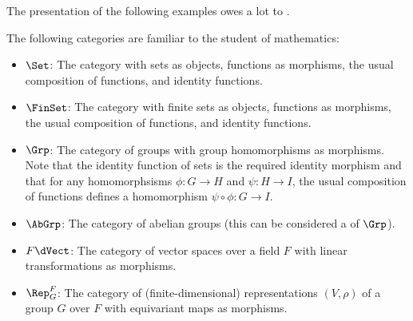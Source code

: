 \documentclass[a5paper]{article}
\begin{document}

The presentation of the following examples owes a lot to \cite{riehl}.

\begin{example}
	The following categories are familiar to the student of
  mathematics:
  \begin{itemize}
    \itemsep-0.2em
    \item $\Set$: The category with sets as objects, functions as morphisms,
      the usual composition of functions, and identity functions.
    \item $\FinSet$: The category with finite sets as objects, functions as
      morphisms, the usual composition of functions, and identity functions.
    \item $\Grp$: The category of groups with group homomorphisms
      as morphisms. Note that the identity function of sets is the required
      identity morphism and that for any homomorphsisms $ϕ:G\to H$ and
      $ψ:H\to I$, the usual composition of functions defines a homomorphism
      $ψ\circ  ϕ:G\to I$.
    \item $\AbGrp$: The category of abelian groups (this can be considered a
       of $\Grp$).
    \item $F\dVect$: The category of vector spaces over a
      field $F$ with linear transformations as morphisms.
    \item $\Rep_G^F$: The category of (finite-dimensional) representations
      $(V,\rho)$ of a group $G$ over $F$ with equivariant maps as morphisms. 
  \end{itemize}
\end{example}
\end{document}
